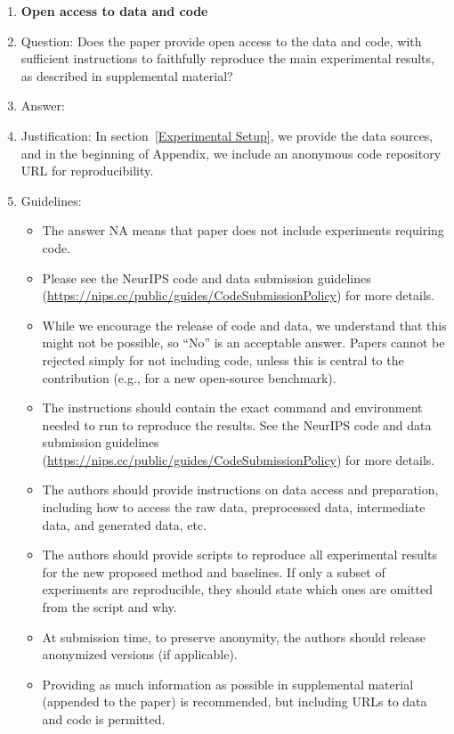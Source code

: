 \documentclass{article}
\begin{document}
\begin{enumerate}
\item {\bf Open access to data and code}
    \item[] Question: Does the paper provide open access to the data and code, with sufficient instructions to faithfully reproduce the main experimental results, as described in supplemental material?
    \item[] Answer: \answerYes{} %
    \item[] Justification: In section~\ref{Experimental Setup}, we provide the data sources, and in the beginning of Appendix, we include an anonymous code repository URL for reproducibility.
    \item[] Guidelines:
    \begin{itemize}
        \item The answer NA means that paper does not include experiments requiring code.
        \item Please see the NeurIPS code and data submission guidelines (\url{https://nips.cc/public/guides/CodeSubmissionPolicy}) for more details.
        \item While we encourage the release of code and data, we understand that this might not be possible, so “No” is an acceptable answer. Papers cannot be rejected simply for not including code, unless this is central to the contribution (e.g., for a new open-source benchmark).
        \item The instructions should contain the exact command and environment needed to run to reproduce the results. See the NeurIPS code and data submission guidelines (\url{https://nips.cc/public/guides/CodeSubmissionPolicy}) for more details.
        \item The authors should provide instructions on data access and preparation, including how to access the raw data, preprocessed data, intermediate data, and generated data, etc.
        \item The authors should provide scripts to reproduce all experimental results for the new proposed method and baselines. If only a subset of experiments are reproducible, they should state which ones are omitted from the script and why.
        \item At submission time, to preserve anonymity, the authors should release anonymized versions (if applicable).
        \item Providing as much information as possible in supplemental material (appended to the paper) is recommended, but including URLs to data and code is permitted.
    \end{itemize}



\end{enumerate}
\end{document}
